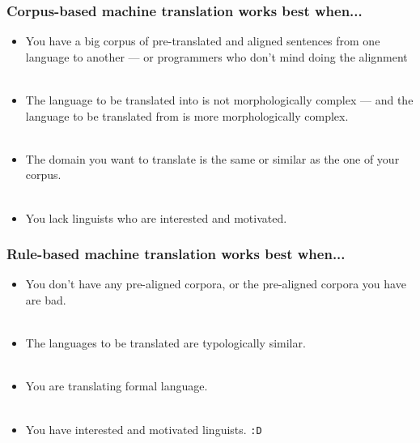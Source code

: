 \documentclass{beamer}
\begin{document}
\begin{frame}
  \frametitle{Corpus-based machine translation works best when...}

\begin{itemize}

  \item You have a big corpus of pre-translated and aligned sentences from one language to another --- or programmers
     who don't mind doing the alignment \\

~\\
  \item The language to be translated into is not morphologically complex --- and the language to be 
         translated from is more morphologically complex. \\
~\\
  \item The domain you want to translate is the same or similar as the one of your corpus. \\
~\\
  \item You lack linguists who are interested and motivated. \\
\end{itemize}

\end{frame}


\begin{frame}
  \frametitle{Rule-based machine translation works best when...} 

\begin{itemize}
  \item You don't have any pre-aligned corpora, or the pre-aligned corpora you have are bad. \\
~\\
  \item The languages to be translated are typologically similar. \\
~\\
  \item You are translating formal language. \\
~\\
  \item You have interested and motivated linguists. \texttt{:D} \\

\end{itemize}

\end{frame}
\end{document}
